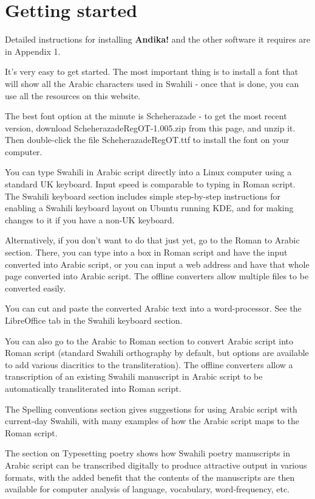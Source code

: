 \documentclass[a4paper,10pt]{article}
\begin{document}
\section{Getting started}

Detailed instructions for installing \textbf{Andika!} and the other software it requires are in Appendix 1.

It's very easy to get started. The most important thing is to install a font that will show all the Arabic characters used in Swahili - once that is done, you can use all the resources on this website.

The best font option at the minute is Scheherazade - to get the most recent version, download ScheherazadeRegOT-1.005.zip from this page, and unzip it. Then double-click the file ScheherazadeRegOT.ttf to install the font on your computer.

You can type Swahili in Arabic script directly into a Linux computer using a standard UK keyboard. Input speed is comparable to typing in Roman script. The Swahili keyboard section includes simple step-by-step instructions for enabling a Swahili keyboard layout on Ubuntu running KDE, and for making changes to it if you have a non-UK keyboard.

Alternatively, if you don't want to do that just yet, go to the Roman to Arabic section. There, you can type into a box in Roman script and have the input converted into Arabic script, or you can input a web address and have that whole page converted into Arabic script. The offline converters allow multiple files to be converted easily.

You can cut and paste the converted Arabic text into a word-processor. See the LibreOffice tab in the Swahili keyboard section.

You can also go to the Arabic to Roman section to convert Arabic script into Roman script (standard Swahili orthography by default, but options are available to add various diacritics to the transliteration). The offline converters allow a transcription of an existing Swahili manuscript in Arabic script to be automatically transliterated into Roman script.

The Spelling conventions section gives suggestions for using Arabic script with current-day Swahili, with many examples of how the Arabic script maps to the Roman script.

The section on Typesetting poetry shows how Swahili poetry manuscripts in Arabic script can be transcribed digitally to produce attractive output in various formats, with the added benefit that the contents of the manuscripts are then available for computer analysis of language, vocabulary, word-frequency, etc.
\end{document}
